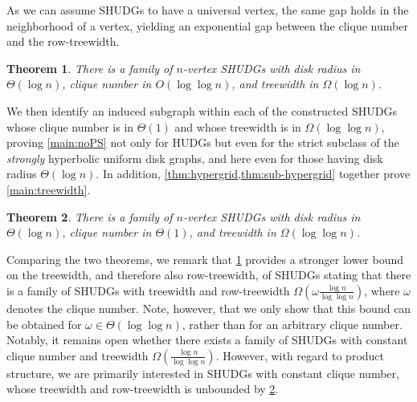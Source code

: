\documentclass[11pt]{article}
\newtheorem{theorem}{Theorem}
\newcommand{\Thomas}[1]{}
\begin{document}
As we can assume SHUDGs to have a universal vertex, the same gap holds in the neighborhood of a vertex, yielding an exponential gap between the clique number and the row-treewidth.
%
%
\begin{theorem}\label{thm:hypergrid}
    There is a family of $ n $-vertex SHUDGs with disk radius in $\Theta(\log n)$, clique number
    in $O(\log \log n)$, and treewidth in $\Omega(\log n)$.
\end{theorem}
%
We then identify an induced subgraph within each of the constructed SHUDGs whose clique number is in $\Theta(1)$ and whose
treewidth is in $\Omega(\log \log n)$, proving \cref{main:noPS} not only for HUDGs but even for the strict subclass of the \emph{strongly} hyperbolic uniform disk graphs, and here even for those having disk radius $ \Theta(\log n)$.
In addition, \cref{thm:hypergrid,thm:sub-hypergrid} together prove \cref{main:treewidth}.
%
\begin{theorem}\label{thm:sub-hypergrid}
    There is a family of $ n $-vertex SHUDGs with disk radius in $\Theta(\log n)$, clique number in $\Theta(1)$,
    and treewidth in $\Omega(\log \log n)$.
\end{theorem}
%
Comparing the two theorems, we remark that \cref{thm:hypergrid} provides a stronger lower bound on the treewidth, and therefore also row-treewidth, of SHUDGs stating that there is a family of SHUDGs
with treewidth and row-treewidth $\Omega (\omega \frac{\log n}{\log \log n} )$, where $\omega$ denotes the clique number.
Note, however, that we only show that this bound can be obtained for $\omega \in \Theta(\log \log n)$, rather than for an
arbitrary clique number.
Notably, it remains open whether there exists a family of SHUDGs with constant clique number and treewidth $\Omega ( \frac{\log n}{\log \log n} )$.
However, with regard to product structure, we are primarily interested in SHUDGs with constant clique number, whose treewidth and row-treewidth is unbounded by \cref{thm:sub-hypergrid}.
\end{document}
